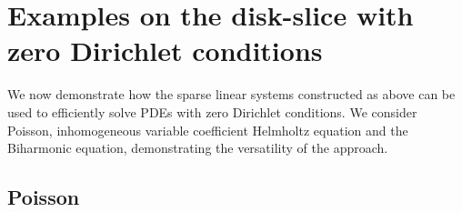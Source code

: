 \documentclass[11pt, oneside]{article}   	%
\begin{document}
%
\section{Examples on the disk-slice with zero Dirichlet conditions}\label{Section:Examples}

We now demonstrate how the sparse linear systems constructed as above can be used to efficiently solve PDEs with zero Dirichlet conditions. We consider Poisson, inhomogeneous variable coefficient Helmholtz equation and the Biharmonic equation, demonstrating the versatility of the approach. 

\subsection{Poisson}

\begin{figure}[t]
	\begin{subfigure}{0.3\textwidth}

\end{subfigure}
\end{figure}
\end{document}
